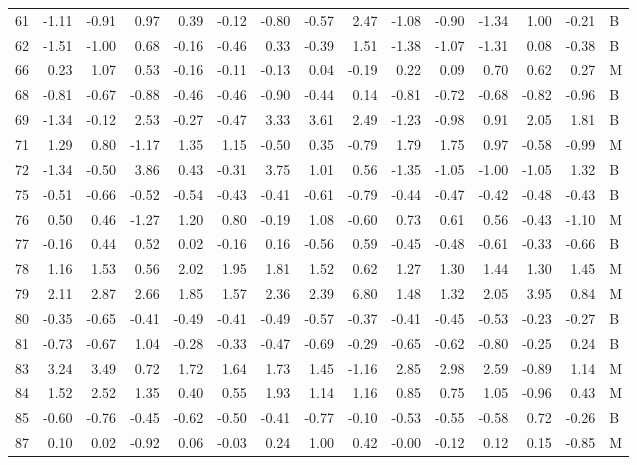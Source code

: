 \begin{table}[ht]
\begin{tabular}{rrrrrrrrrrrrrrl}
  61 & -1.11 & -0.91 & 0.97 & 0.39 & -0.12 & -0.80 & -0.57 & 2.47 & -1.08 & -0.90 & -1.34 & 1.00 & -0.21 & B \\ 
  62 & -1.51 & -1.00 & 0.68 & -0.16 & -0.46 & 0.33 & -0.39 & 1.51 & -1.38 & -1.07 & -1.31 & 0.08 & -0.38 & B \\ 
  66 & 0.23 & 1.07 & 0.53 & -0.16 & -0.11 & -0.13 & 0.04 & -0.19 & 0.22 & 0.09 & 0.70 & 0.62 & 0.27 & M \\ 
  68 & -0.81 & -0.67 & -0.88 & -0.46 & -0.46 & -0.90 & -0.44 & 0.14 & -0.81 & -0.72 & -0.68 & -0.82 & -0.96 & B \\ 
  69 & -1.34 & -0.12 & 2.53 & -0.27 & -0.47 & 3.33 & 3.61 & 2.49 & -1.23 & -0.98 & 0.91 & 2.05 & 1.81 & B \\ 
  71 & 1.29 & 0.80 & -1.17 & 1.35 & 1.15 & -0.50 & 0.35 & -0.79 & 1.79 & 1.75 & 0.97 & -0.58 & -0.99 & M \\ 
  72 & -1.34 & -0.50 & 3.86 & 0.43 & -0.31 & 3.75 & 1.01 & 0.56 & -1.35 & -1.05 & -1.00 & -1.05 & 1.32 & B \\ 
  75 & -0.51 & -0.66 & -0.52 & -0.54 & -0.43 & -0.41 & -0.61 & -0.79 & -0.44 & -0.47 & -0.42 & -0.48 & -0.43 & B \\ 
  76 & 0.50 & 0.46 & -1.27 & 1.20 & 0.80 & -0.19 & 1.08 & -0.60 & 0.73 & 0.61 & 0.56 & -0.43 & -1.10 & M \\ 
  77 & -0.16 & 0.44 & 0.52 & 0.02 & -0.16 & 0.16 & -0.56 & 0.59 & -0.45 & -0.48 & -0.61 & -0.33 & -0.66 & B \\ 
  78 & 1.16 & 1.53 & 0.56 & 2.02 & 1.95 & 1.81 & 1.52 & 0.62 & 1.27 & 1.30 & 1.44 & 1.30 & 1.45 & M \\ 
  79 & 2.11 & 2.87 & 2.66 & 1.85 & 1.57 & 2.36 & 2.39 & 6.80 & 1.48 & 1.32 & 2.05 & 3.95 & 0.84 & M \\ 
  80 & -0.35 & -0.65 & -0.41 & -0.49 & -0.41 & -0.49 & -0.57 & -0.37 & -0.41 & -0.45 & -0.53 & -0.23 & -0.27 & B \\ 
  81 & -0.73 & -0.67 & 1.04 & -0.28 & -0.33 & -0.47 & -0.69 & -0.29 & -0.65 & -0.62 & -0.80 & -0.25 & 0.24 & B \\ 
  83 & 3.24 & 3.49 & 0.72 & 1.72 & 1.64 & 1.73 & 1.45 & -1.16 & 2.85 & 2.98 & 2.59 & -0.89 & 1.14 & M \\ 
  84 & 1.52 & 2.52 & 1.35 & 0.40 & 0.55 & 1.93 & 1.14 & 1.16 & 0.85 & 0.75 & 1.05 & -0.96 & 0.43 & M \\ 
  85 & -0.60 & -0.76 & -0.45 & -0.62 & -0.50 & -0.41 & -0.77 & -0.10 & -0.53 & -0.55 & -0.58 & 0.72 & -0.26 & B \\ 
  87 & 0.10 & 0.02 & -0.92 & 0.06 & -0.03 & 0.24 & 1.00 & 0.42 & -0.00 & -0.12 & 0.12 & 0.15 & -0.85 & M \\ 

\end{tabular}
\end{table}
